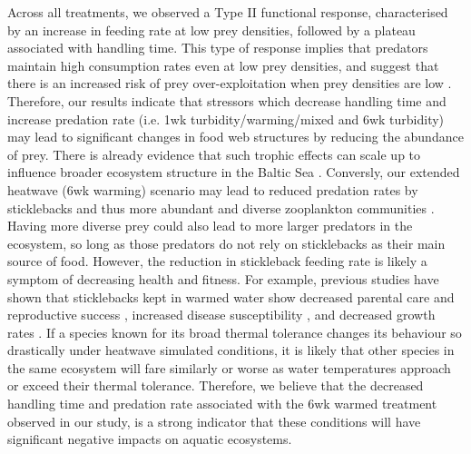 \documentclass[ASNA,twocolumn]{USG} %
\begin{document}
Across all treatments, we observed a Type II functional response, characterised by an increase in feeding rate at low prey densities, followed by a plateau associated with handling time. This type of response implies that predators maintain high consumption rates even at low prey densities, and suggest that there is an increased risk of prey over-exploitation when prey densities are low \citep{hollingCharacteristicsSimpleTypes1959}. Therefore, our results indicate that stressors which decrease handling time and increase predation rate (i.e. 1wk turbidity/warming/mixed and 6wk turbidity) may lead to significant changes in food web structures by reducing the abundance of prey. There is already evidence that such trophic effects can scale up to influence broader ecosystem structure in the Baltic Sea \citep{donadiCrossscaleTrophicCascade2017}. Conversly, our extended heatwave (6wk warming) scenario may lead to reduced predation rates by sticklebacks and thus more abundant and diverse zooplankton communities \citep{jakobsentsImpactThreespinedStickleback2003}. Having more diverse prey could also lead to more larger predators in the ecosystem, so long as those predators do not rely on sticklebacks as their main source of food. However, the reduction in stickleback feeding rate is likely a symptom of decreasing health and fitness. For example, previous studies have shown that sticklebacks kept in warmed water show decreased parental care and reproductive success \citep{hopkinsIncreasedAmbientTemperature2011, haniEffectsChronicExposure2019d}, increased disease susceptibility \citep{karvonenWaterTemperatureNot2013, schadeImpactThermalStress2014, dittmarHeatImmunityExperimental2014}, and decreased growth rates \citep{lefebureTemperaturedependentGrowthModel2011}. If a species known for its broad thermal tolerance changes its behaviour so drastically under heatwave simulated conditions, it is likely that other species in the same ecosystem will fare similarly or worse as water temperatures approach or exceed their thermal tolerance. Therefore, we believe that the decreased handling time and predation rate associated with the 6wk warmed treatment observed in our study, is a strong indicator that these conditions will have significant negative impacts on aquatic ecosystems. 
\end{document}
